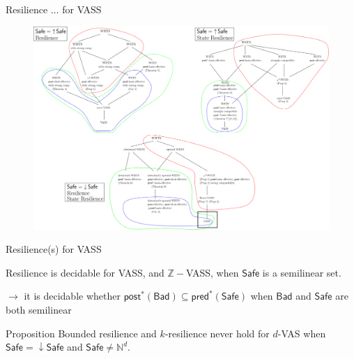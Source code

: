 \documentclass{beamer}
\newcommand{\N}{\mathbb{N}}
\newcommand{\pred}{\textsf{pred}}
\newcommand{\post}{\textsf{post}}
\newcommand{\Bad}{\textsf{Bad}}
\newcommand{\Safe}{\textsf{Safe}}
\begin{document}
  \begin{frame}{Resilience $\ldots$ for VASS}
 
   \begin{center}
 	\begin{figure}
 	\vspace{-0.25cm}
\includegraphics[width=1.00\textwidth]{resultC}
	\end{figure}
\end{center}  



  \end{frame}
  \begin{frame}{Resilience(s) for VASS}

\begin{theorem}\label{SL VASS}
{\sc Resilience} is decidable for VASS, and $\mathbb{Z}-$VASS, when $\Safe$  is a semilinear set.
\end{theorem}


$\to$ it is decidable whether $\post^*(\Bad) \subseteq \pred^*(\Safe)$ when 
$\Bad$ and $\Safe$ are both semilinear~\cite{DBLP:journals/corr/abs-2207-02697}

 
\pause

\begin{block}{Proposition}
{\sc Bounded resilience} and {\sc $k$-resilience} never hold for $d$-VAS when $\Safe = \mathop{\downarrow} \Safe$ and $\Safe \neq \N^d$.
\end{block}


   \end{frame}
\end{document}
